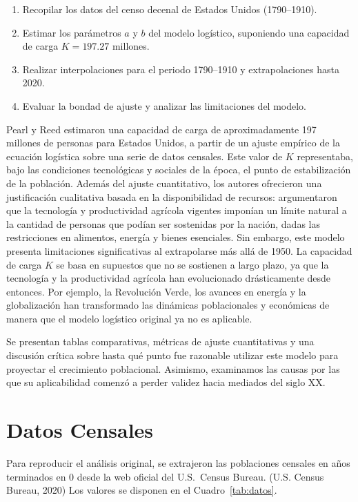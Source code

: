 \documentclass[12pt]{article}
\begin{document}
\begin{enumerate}
\item Recopilar los datos del censo decenal de Estados Unidos (1790–1910).
\item Estimar los parámetros $a$ y $b$ del modelo logístico, suponiendo una capacidad de carga $K = 197.27$ millones.
\item Realizar interpolaciones para el periodo 1790–1910 y extrapolaciones hasta 2020.
\item Evaluar la bondad de ajuste y analizar las limitaciones del modelo.
\end{enumerate}


Pearl y Reed estimaron una capacidad de carga de aproximadamente 197 millones de personas para Estados Unidos, a partir de un ajuste empírico de la ecuación logística sobre una serie de datos censales. Este valor de $K$ representaba, bajo las condiciones tecnológicas y sociales de la época, el punto de estabilización de la población. Además del ajuste cuantitativo, los autores ofrecieron una justificación cualitativa basada en la disponibilidad de recursos: argumentaron que la tecnología y productividad agrícola vigentes imponían un límite natural a la cantidad de personas que podían ser sostenidas por la nación, dadas las restricciones en alimentos, energía y bienes esenciales.
Sin embargo, este modelo presenta limitaciones significativas al extrapolarse más allá de 1950. La capacidad de carga $K$ se basa en supuestos que no se sostienen a largo plazo, ya que la tecnología y la productividad agrícola han evolucionado drásticamente desde entonces. Por ejemplo, la Revolución Verde, los avances en energía y la globalización han transformado las dinámicas poblacionales y económicas de manera que el modelo logístico original ya no es aplicable.

Se presentan tablas comparativas, métricas de ajuste cuantitativas y una discusión crítica sobre hasta qué punto fue razonable utilizar este modelo para proyectar el crecimiento poblacional. Asimismo, examinamos las causas por las que su aplicabilidad comenzó a perder validez hacia mediados del siglo XX.



\section{Datos Censales}  %
Para reproducir el análisis original, se extrajeron las poblaciones
censales en años terminados en 0 desde la web oficial del U.S.\ Census Bureau. (U.S. Census Bureau, 2020)
Los valores se disponen en el Cuadro~\ref{tab:datos}.
\end{document}
